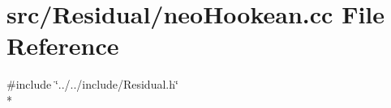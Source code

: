 \section{src/\-Residual/neo\-Hookean.cc File Reference}
\label{neo_hookean_8cc}
{\ttfamily \#include \char`\"{}../../include/\-Residual.\-h\char`\"{}}\\*
